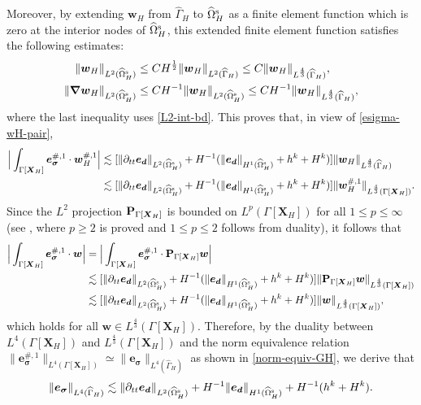\documentclass[11pt,reqno]{amsart}
\theoremstyle{definition}
\theoremstyle{plain}
\numberwithin{theorem}{section}
\numberwithin{proposition}{section}
\numberwithin{lemma}{section}
\numberwithin{equation}{section}
\newcommand{\bs}[1]{\boldsymbol{#1}}
\newcommand{\uu}[1]  {{\bs{#1}} }
\newcommand{\dep}{{{\bs{d}}}}
\newcommand{\grad}   { \uu{\nabla}    }
\newcommand{\bw}{{\bs w}}
\renewcommand{\(}{\bigl(}
\renewcommand{\)}{\bigr)}
\begin{document}
Moreover, by extending ${\bs w}_H$ from $\widehat\Gamma_H$ to $\widehat{\Omega}^{\rm s}_H$ as a finite element function which is zero at the interior nodes of $\widehat{\Omega}^{\rm s}_H$, this extended finite element function satisfies the following estimates: 
\begin{align}
\| \bw_H \|_{L^2(\widehat{\Omega}^{\rm s}_H)} 
&\le CH^{\frac12} \| \bw_H \|_{L^2(\widehat\Gamma_H)}  
\le C \| \bw_H \|_{L^{\frac43}(\widehat\Gamma_H)} , \label{L2-int-bd}\\ 
\| \grad \bw_H \|_{L^2(\widehat{\Omega}^{\rm s}_H)} 
&\le CH^{-1} \| \bw_H \|_{L^2(\widehat{\Omega}^{\rm s}_H)} 
\le CH^{-1} \| \bw_H \|_{L^{\frac43}(\widehat\Gamma_H)} ,
\end{align} 
where the last inequality uses \eqref{L2-int-bd}. 
This proves that, in view of \eqref{esigma-wH-pair}, 
\begin{align*}%
\Big|\int_{\Gamma[\bs X_H]} {\bs e}_{\bs\sigma}^{\#,1} \cdot \bw_H^{\#,1} \Big|
&\lesssim 
[\|\partial_{tt}{\bs e}_{\dep}\|_{L^2(\widehat{\Omega}^{\rm s}_H)} 
+ H^{-1}(\|{\bs e}_\dep\|_{H^1(\widehat{\Omega}^{\rm s}_H)} 
+ h^k+H^k)] \| \bw_H \|_{L^{\frac43}(\widehat\Gamma_H)} \notag \\
&\lesssim 
[\|\partial_{tt}{\bs e}_{\dep}\|_{L^2(\widehat{\Omega}^{\rm s}_H)} 
+ H^{-1}(\|{\bs e}_\dep\|_{H^1(\widehat{\Omega}^{\rm s}_H)} 
+ h^k+H^k)] \| \bw_H^{\#,1} \|_{L^{\frac43}(\Gamma[\bs X_H])} . 
\end{align*}
Since the $L^2$ projection ${\bf P}_{\Gamma[\bs X_H]}$ is bounded on $L^p(\Gamma[\bs X_H])$ for all $1\le p\le \infty$ (see \cite[Appendix B]{Li-Tang-2025}, where $p\ge 2$ is proved and $1\le p\le 2$ follows from duality), it follows that 
\begin{align}\label{esigma-L4-1} 
\Big|\int_{\Gamma[\bs X_H]} {\bs e}_{\bs\sigma}^{\#,1} \cdot \bw \Big|
&= \Big|\int_{\Gamma[\bs X_H]} {\bs e}_{\bs\sigma}^{\#,1} \cdot {\bf P}_{\Gamma[\bs X_H]}\bw \Big| \notag\\
&\lesssim 
[\|\partial_{tt}{\bs e}_{\dep}\|_{L^2(\widehat{\Omega}^{\rm s}_H)} 
+ H^{-1}(\|{\bs e}_\dep\|_{H^1(\widehat{\Omega}^{\rm s}_H)} 
+ h^k+H^k)] \| {\bf P}_{\Gamma[\bs X_H]}\bw \|_{L^{\frac43}(\Gamma[\bs X_H])} \notag\\
&\lesssim 
[\|\partial_{tt}{\bs e}_{\dep}\|_{L^2(\widehat{\Omega}^{\rm s}_H)} 
+ H^{-1}(\|{\bs e}_\dep\|_{H^1(\widehat{\Omega}^{\rm s}_H)} 
+ h^k+H^k)] \|\bw \|_{L^{\frac43}(\Gamma[\bs X_H])} ,
\end{align}
which holds for all $\bw\in L^{\frac43}(\Gamma[\bs X_H])$. Therefore, by the duality between $L^4(\Gamma[{\bs X}_H])$ and $L^{\frac43}(\Gamma[\bs X_H])$ and the norm equivalence relation $\|{\bs e}_{\bs\sigma}^{\#,1}\|_{L^4(\Gamma[{\bs X}_H])} \simeq \|{\bs e}_{\bs\sigma}\|_{L^4(\widehat\Gamma_H)}$ as shown in \eqref{norm-equiv-GH}, we derive that
\begin{align}\label{esigma-L4} 
\| {\bs e}_{{\bs\sigma}}\|_{L^4(\widehat\Gamma_H)} 
\lesssim  
\|\partial_{tt} {\bs e}_{\dep}\|_{L^2(\widehat{\Omega}^{\rm s}_H)} + H^{-1} \|{\bs e}_\dep\|_{H^1(\widehat{\Omega}^{\rm s}_H)} 
+ H^{-1} (h^k+H^k) . 
\end{align} 
\end{document}
